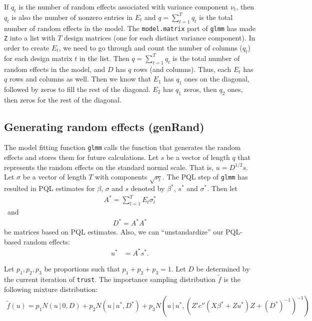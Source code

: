 \documentclass{article}
\begin{document}
If $q_t$ is the number of random effects associated with variance component $\nu_t$, then $q_t$ is also the number of nonzero entries in $E_t$ and $q=\sum_{t=1}^T q_t$ is the total number of random effects in the model.  
The \texttt{model.matrix} part of \texttt{glmm} has made  \texttt{Z} into a list with $T$ design matrices (one for each distinct variance component).  In order to create $E_t$, we need to go through and count the  number of columns ($q_t$) for each design matrix $t$ in the list.
 Then $q=\sum_{t=1}^T q_t$ is the total number of random effects in the model, and $D$  has $q$ rows (and columns). Thus, each $E_t$  has $q$ rows and columns as well.  Then we know that $E_1$ has $q_1$ ones on the diagonal, followed by zeros to fill the rest of the diagonal.  $E_2$ has $q_1$ zeros, then $q_2$ ones, then zeros for the rest of the diagonal.



\subsection{Generating random effects (genRand)}\label{sec:genRand}
The model fitting function \texttt{glmm}  calls the function that generates the random effects and  stores them for future calculations. Let $s$ be a vector of length $q$ that represents the random effects on the standard normal scale. That is, $u= D^{1/2}s$. Let $\sigma$ be a vector of length $T$ with components $\sqrt{\nu_t}$.  The  PQL step of \texttt{glmm} has resulted in PQL estimates for $\beta$, $\sigma$ and  $s$ denoted by $\beta^*$, $s^*$ and $\sigma^*$. Then let
\begin{align}
A^*=\sum_{t=1}^T E_t \sigma^*_t
\end{align}\
and
\begin{align}
 D^* =A^*A^*
\end{align}
be matrices based on PQL estimates. Also, we can ``unstandardize'' our PQL-based random effects:
\begin{align}
u^*&=A^*s^*.
\end{align}

Let $p_1,p_2,p_3$ be proportions such that  $p_1+p_2+p_3=1$. Let $D$ be determined by the current iteration of \texttt{trust}. The importance sampling distribution $\tilde{f}$ is the following mixture distribution:
\begin{align}
 \tilde{f}(u) = p_1  N(u \, | \, 0, D)+p_2  N(u \, | \, u^*, D^*)+p_3  N(u \, | \, u^*, (Z'  c''(X \beta^*+Zu^*) Z +(D^*)^{-1}   )^{-1}) \label{eq:ftwiddle}
\end{align}
\end{document}
